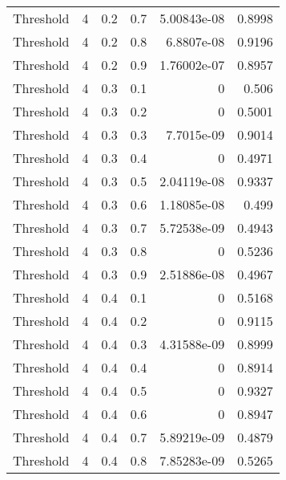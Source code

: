 \documentclass{article}
\begin{document}
\begin{longtable}[H]{lrrrrr}
 Threshold      &       4 &   0.2 &            0.7 &      5.00843e-08 &          0.8998 \\
 Threshold      &       4 &   0.2 &            0.8 &      6.8807e-08  &          0.9196 \\
 Threshold      &       4 &   0.2 &            0.9 &      1.76002e-07 &          0.8957 \\
 Threshold      &       4 &   0.3 &            0.1 &      0           &          0.506  \\
 Threshold      &       4 &   0.3 &            0.2 &      0           &          0.5001 \\
 Threshold      &       4 &   0.3 &            0.3 &      7.7015e-09  &          0.9014 \\
 Threshold      &       4 &   0.3 &            0.4 &      0           &          0.4971 \\
 Threshold      &       4 &   0.3 &            0.5 &      2.04119e-08 &          0.9337 \\
 Threshold      &       4 &   0.3 &            0.6 &      1.18085e-08 &          0.499  \\
 Threshold      &       4 &   0.3 &            0.7 &      5.72538e-09 &          0.4943 \\
 Threshold      &       4 &   0.3 &            0.8 &      0           &          0.5236 \\
 Threshold      &       4 &   0.3 &            0.9 &      2.51886e-08 &          0.4967 \\
 Threshold      &       4 &   0.4 &            0.1 &      0           &          0.5168 \\
 Threshold      &       4 &   0.4 &            0.2 &      0           &          0.9115 \\
 Threshold      &       4 &   0.4 &            0.3 &      4.31588e-09 &          0.8999 \\
 Threshold      &       4 &   0.4 &            0.4 &      0           &          0.8914 \\
 Threshold      &       4 &   0.4 &            0.5 &      0           &          0.9327 \\
 Threshold      &       4 &   0.4 &            0.6 &      0           &          0.8947 \\
 Threshold      &       4 &   0.4 &            0.7 &      5.89219e-09 &          0.4879 \\
 Threshold      &       4 &   0.4 &            0.8 &      7.85283e-09 &          0.5265 \\

\end{longtable}
\end{document}
